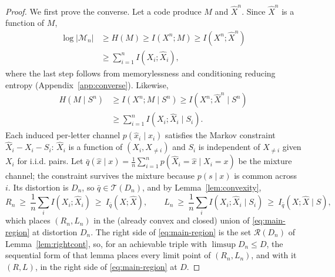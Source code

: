 ﻿\documentclass[11pt,onecolumn]{IEEEtran}
\newcommand{\hX}{\widehat{X}}
\newcommand{\hXn}{\widehat{X}^{n}}
\begin{document}
\begin{proof}
We first prove the converse. Let a code produce $M$ and $\hXn$. Since $\hXn$
is a function of $M$,
\begin{align}
 \log|\mathcal M_n|
 &\ge H(M)\ge I(X^n;M)\ge I(X^n;\hXn)\nonumber\\
 &\ge \sum_{i=1}^{n}I(X_i;\hX_i),
 \label{eq:rate-conv}
\end{align}
where the last step follows from memorylessness and conditioning reducing
entropy (Appendix~\ref{app:converse}). Likewise,
\begin{align}
 H(M\mid S^n)
 &\ge I(X^n;M\mid S^n)
 \ge I(X^n;\hXn\mid S^n)\nonumber\\
 &\ge \sum_{i=1}^{n}I(X_i;\hX_i\mid S_i).
 \label{eq:work-conv}
\end{align}
Each induced per-letter channel $p(\hat x_i\mid x_i)$ satisfies the Markov
constraint $\hX_i-X_i-S_i$: $\hX_i$ is a function of $(X_i,X_{\ne i})$ and
$S_i$ is independent of $X_{\ne i}$ given $X_i$ for i.i.d. pairs. Let
$\bar q(\hat x\mid x)=\frac1n\sum_{i=1}^{n}p(\hX_i=\hat x\mid X_i=x)$ be
the mixture channel; the constraint survives the mixture because
$p(s\mid x)$ is common across $i$. Its distortion is $D_n$, so
$\bar q\in\mathcal T(D_n)$, and by Lemma~\ref{lem:convexity},
\begin{equation*}
 R_n\ \ge\ \frac1n\sum_i I(X_i;\hX_i)\ \ge\ I_{\bar q}(X;\hX),
 \qquad
 L_n\ \ge\ \frac1n\sum_i I(X_i;\hX_i\mid S_i)\ \ge\ I_{\bar q}(X;\hX\mid S),
\end{equation*}
which places $(R_n,L_n)$ in the (already convex and closed) union of
\eqref{eq:main-region} at distortion $D_n$. The right side of
\eqref{eq:main-region} is the set $\mathcal R(D_n)$ of
Lemma~\ref{lem:rightcont}, so, for an achievable triple with
$\limsup D_n\le D$, the sequential form of that lemma places every
limit point of $(R_n,L_n)$, and with it $(R,L)$, in the right side of
\eqref{eq:main-region} at $D$.


\end{proof}
\end{document}
